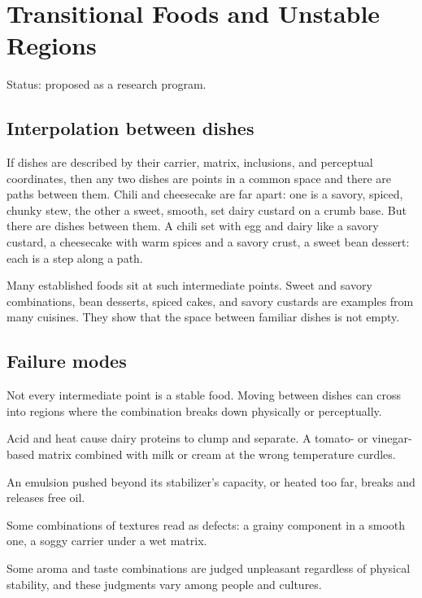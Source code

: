 \documentclass[11pt,openany]{book}
\theoremstyle{definition}
\begin{document}
\chapter{Transitional Foods and Unstable Regions}\label{ch:transitional}

Status: proposed as a research program.

\section{Interpolation between dishes}

If dishes are described by their carrier, matrix, inclusions, and perceptual coordinates, then any two dishes are points in a common space and there are paths between them. Chili and cheesecake are far apart: one is a savory, spiced, chunky stew, the other a sweet, smooth, set dairy custard on a crumb base. But there are dishes between them. A chili set with egg and dairy like a savory custard, a cheesecake with warm spices and a savory crust, a sweet bean dessert: each is a step along a path.

Many established foods sit at such intermediate points. Sweet and savory combinations, bean desserts, spiced cakes, and savory custards are examples from many cuisines. They show that the space between familiar dishes is not empty.

\section{Failure modes}

Not every intermediate point is a stable food. Moving between dishes can cross into regions where the combination breaks down physically or perceptually.

\begin{description}[leftmargin=1.5em]
\item[Curdling.] Acid and heat cause dairy proteins to clump and separate. A tomato- or vinegar-based matrix combined with milk or cream at the wrong temperature curdles.
\item[Fat separation.] An emulsion pushed beyond its stabilizer's capacity, or heated too far, breaks and releases free oil.
\item[Texture conflict.] Some combinations of textures read as defects: a grainy component in a smooth one, a soggy carrier under a wet matrix.
\item[Perceptual conflict.] Some aroma and taste combinations are judged unpleasant regardless of physical stability, and these judgments vary among people and cultures.
\end{description}
\end{document}
